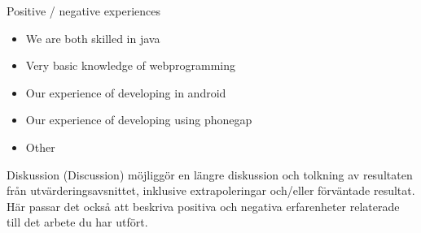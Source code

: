 Positive / negative experiences
\begin{itemize}
    \item We are both skilled in java
    \item Very basic knowledge of webprogramming
    \item Our experience of developing in android
    \item Our experience of developing using phonegap
    \item Other
\end{itemize}

Diskussion (Discussion) möjliggör en längre diskussion och tolkning av resultaten från utvärderingsavsnittet, inklusive extrapoleringar och/eller förväntade resultat. Här passar det också att beskriva positiva och negativa erfarenheter relaterade till det arbete du har utfört.